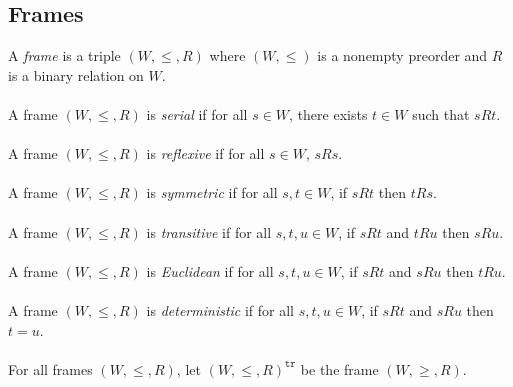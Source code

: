 \documentclass[draft]{article}
\begin{document}
\subsection{Frames}
%
%
A {\em frame}\/ is a triple $(W,{\leq},{R})$ where $(W,{\leq})$ is a nonempty preorder and ${R}$ is a binary relation on $W$.
%
%
%
%
%
%
\\
\\
%
%
A frame $(W,{\leq},{R})$ is {\em serial}\/ if for all $s{\in}W$, there exists $t{\in}W$ such that $s{R}t$.
%
%
\\
\\
%
%
A frame $(W,{\leq},{R})$ is {\em reflexive}\/ if for all $s{\in}W$, $s{R}s$.
%
%
\\
\\
%
%
A frame $(W,{\leq},{R})$ is {\em symmetric}\/ if for all $s,t{\in}W$, if $s{R}t$ then $t{R}s$.
%
%
\\
\\
%
%
A frame $(W,{\leq},{R})$ is {\em transitive}\/ if for all $s,t,u{\in}W$, if $s{R}t$ and $t{R}u$ then $s{R}u$.
%
%
\\
\\
%
%
A frame $(W,{\leq},{R})$ is {\em Euclidean}\/ if for all $s,t,u{\in}W$, if $s{R}t$ and $s{R}u$ then $t{R}u$.
%
%
\\
\\
%
%
A frame $(W,{\leq},{R})$ is {\em deterministic}\/ if for all $s,t,u{\in}W$, if $s{R}t$ and $s{R}u$ then $t{=}u$.
%
%
%
%
\\
\\
%
%
For all frames $(W,{\leq},{R})$, let $(W,{\leq},{R})^{\mathtt{tr}}$ be the frame $(W,{\geq},{R})$.
%
%
\\
\end{document}
